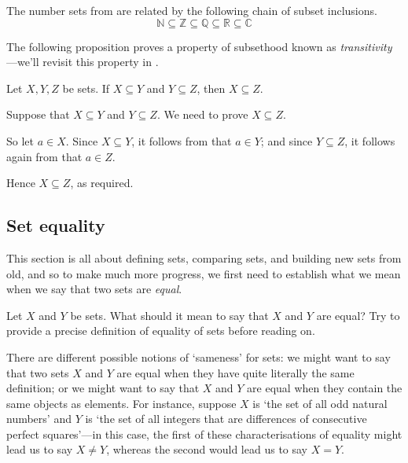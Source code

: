 \begin{example}
The number sets from  are related by the following chain of subset inclusions.
\[ \mathbb{N} \subseteq \mathbb{Z} \subseteq \mathbb{Q} \subseteq \mathbb{R} \subseteq \mathbb{C} \]
\end{example}

The following proposition proves a property of subsethood known as \textit{transitivity}---we'll revisit this property in .

\begin{proposition}
\label{propSubsetTransitive}
Let $X,Y,Z$ be sets. If $X \subseteq Y$ and $Y \subseteq Z$, then $X \subseteq Z$.
\end{proposition}

\begin{cproof}
Suppose that $X \subseteq Y$ and $Y \subseteq Z$. We need to prove $X \subseteq Z$.

So let $a \in X$. Since $X \subseteq Y$, it follows from  that $a \in Y$; and since $Y \subseteq Z$, it follows again from  that $a \in Z$.

Hence $X \subseteq Z$, as required.
\end{cproof}

\subsection*{Set equality}

This section is all about defining sets, comparing sets, and building new sets from old, and so to make much more progress, we first need to establish what we mean when we say that two sets are \textit{equal}.

\begin{discussion}
\label{dscSetEquality}
Let $X$ and $Y$ be sets. What should it mean to say that $X$ and $Y$ are equal? Try to provide a precise definition of equality of sets before reading on.
\end{discussion}

There are different possible notions of `sameness' for sets: we might want to say that two sets $X$ and $Y$ are equal when they have quite literally the same definition; or we might want to say that $X$ and $Y$ are equal when they contain the same objects as elements. For instance, suppose $X$ is `the set of all odd natural numbers' and $Y$ is `the set of all integers that are differences of consecutive perfect squares'---in this case, the first of these characterisations of equality might lead us to say $X \ne Y$, whereas the second would lead us to say $X = Y$.

